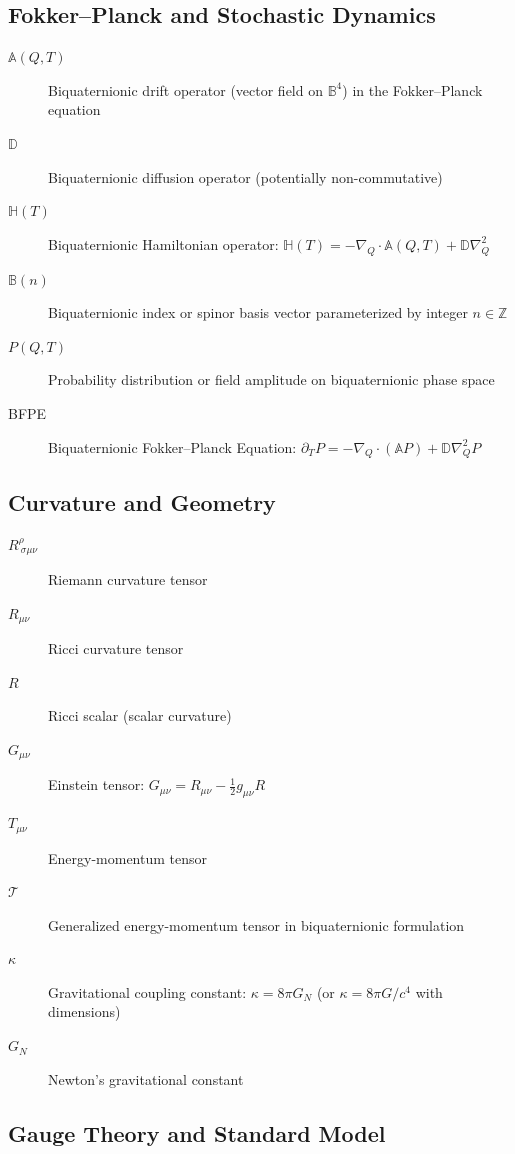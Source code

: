 \subsection{Fokker--Planck and Stochastic Dynamics}

\begin{description}
\item[$\mathbb{A}(Q,T)$] Biquaternionic drift operator (vector field on $\mathbb{B}^4$) in the Fokker--Planck equation
\item[$\mathbb{D}$] Biquaternionic diffusion operator (potentially non-commutative)
\item[$\mathbb{H}(T)$] Biquaternionic Hamiltonian operator: $\mathbb{H}(T) = -\nabla_Q \cdot \mathbb{A}(Q,T) + \mathbb{D}\nabla_Q^2$
\item[$\mathbb{B}(n)$] Biquaternionic index or spinor basis vector parameterized by integer $n \in \mathbb{Z}$
\item[$P(Q,T)$] Probability distribution or field amplitude on biquaternionic phase space
\item[BFPE] Biquaternionic Fokker--Planck Equation: $\partial_T P = -\nabla_Q \cdot (\mathbb{A} P) + \mathbb{D} \nabla_Q^2 P$
\end{description}

\subsection{Curvature and Geometry}

\begin{description}
\item[$R^\rho_{\ \sigma\mu\nu}$] Riemann curvature tensor
\item[$R_{\mu\nu}$] Ricci curvature tensor
\item[$R$] Ricci scalar (scalar curvature)
\item[$G_{\mu\nu}$] Einstein tensor: $G_{\mu\nu} = R_{\mu\nu} - \frac{1}{2}g_{\mu\nu}R$
\item[$T_{\mu\nu}$] Energy-momentum tensor
\item[$\mathcal{T}$] Generalized energy-momentum tensor in biquaternionic formulation
\item[$\kappa$] Gravitational coupling constant: $\kappa = 8\pi G_N$ (or $\kappa = 8\pi G/c^4$ with dimensions)
\item[$G_N$] Newton's gravitational constant
\end{description}

\subsection{Gauge Theory and Standard Model}

